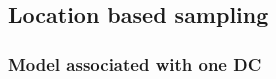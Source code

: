 \documentclass[a4paper,10pt]{article}
\begin{document}
\begin{linenumbers}


\subsection{Location based sampling}


\subsubsection{Model associated with one DC}


\end{linenumbers}
\end{document}
